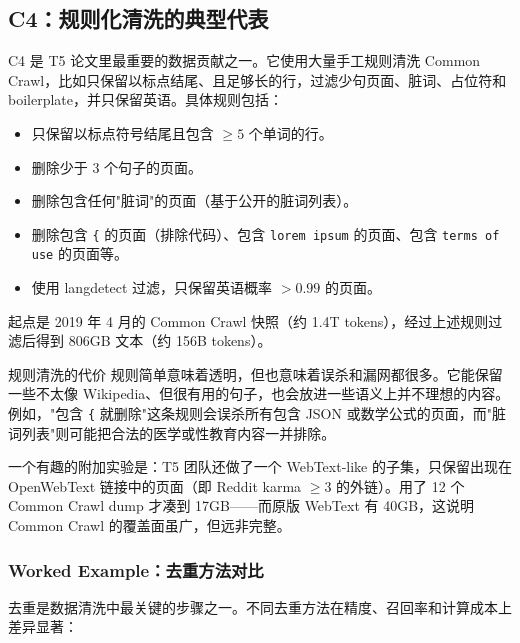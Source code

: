 \subsection{C4：规则化清洗的典型代表}

C4 是 T5 论文里最重要的数据贡献之一。它使用大量手工规则清洗 Common Crawl，比如只保留以标点结尾、且足够长的行，过滤少句页面、脏词、占位符和 boilerplate，并只保留英语。具体规则包括：

\begin{itemize}
    \item 只保留以标点符号结尾且包含 $\geq 5$ 个单词的行。
    \item 删除少于 3 个句子的页面。
    \item 删除包含任何"脏词"的页面（基于公开的脏词列表）。
    \item 删除包含 \texttt{\{} 的页面（排除代码）、包含 \texttt{lorem ipsum} 的页面、包含 \texttt{terms of use} 的页面等。
    \item 使用 langdetect 过滤，只保留英语概率 $> 0.99$ 的页面。
\end{itemize}

起点是 2019 年 4 月的 Common Crawl 快照（约 1.4T tokens），经过上述规则过滤后得到 806GB 文本（约 156B tokens）。

\begin{warningbox}{规则清洗的代价}
规则简单意味着透明，但也意味着误杀和漏网都很多。它能保留一些不太像 Wikipedia、但很有用的句子，也会放进一些语义上并不理想的内容。例如，"包含 \texttt{\{} 就删除"这条规则会误杀所有包含 JSON 或数学公式的页面，而"脏词列表"则可能把合法的医学或性教育内容一并排除。
\end{warningbox}

一个有趣的附加实验是：T5 团队还做了一个 WebText-like 的子集，只保留出现在 OpenWebText 链接中的页面（即 Reddit karma $\geq 3$ 的外链）。用了 12 个 Common Crawl dump 才凑到 17GB——而原版 WebText 有 40GB，这说明 Common Crawl 的覆盖面虽广，但远非完整。

\subsubsection{Worked Example：去重方法对比}

去重是数据清洗中最关键的步骤之一。不同去重方法在精度、召回率和计算成本上差异显著：

